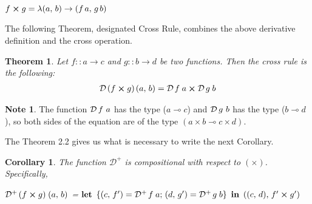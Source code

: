 \documentclass[11pt,a4]{article}
\newtheorem{teor}{Theorem}[section]
\newtheorem{coro}{Corollary}[section]
\theoremstyle{definition}
\theoremstyle{Definition}
\theoremstyle{Definition}
\newtheorem{nota}{Note}[section]
\begin{document}
	$f \boldsymbol{\times} g = \lambda(a,\hspace{0.5mm} b) \to (f \hspace{0.5mm} a,\hspace{0.5mm} g \hspace{0.5mm} b) $
	
	
	The following Theorem, designated Cross Rule, combines the above derivative definition and the cross operation.
	
	\begin{teor}
		Let $f :: a \to c$ and $g :: b \to d$ be two functions. Then the cross rule is the following:
		\begin{align*}
		\mathcal{D} \hspace{0.5mm} (f \boldsymbol{\times} g) \hspace{0.5mm} (a,\hspace{0.5mm} b) = \mathcal{D} \hspace{0.5mm} f \hspace{0.9mm} a \boldsymbol{\times} \mathcal{D} \hspace{0.5mm} g \hspace{0.9mm} b
		\end{align*}
	\end{teor}
	
	\begin{nota}
		
		The function $\mathcal{D} \hspace{0.6mm} f \ a$ has the type ($a \multimap c$) and $\mathcal{D} \hspace{0.6mm} g \ b$ has the type ($b \multimap d$), so both sides of the equation are of the type $(a \times b \multimap c \times d)$.
	\end{nota}
	
	The Theorem 2.2 gives us what is necessary to write the next Corollary.
	
	\begin{coro}
		The function $\mathcal{D}^{+}$ is compositional with respect to $(\boldsymbol{\times})$. Specifically,
		
		\quad $\mathcal{D}^{+} \hspace{0.5mm} (f \boldsymbol{\times} g) \hspace{0.9mm} (a,\hspace{0.5mm} b)$ = $\bf let$ $\{(c,\hspace{0.5mm} f') = \mathcal{D}^{+} \hspace{0.5mm} f \hspace{0.9mm} a; \hspace{0.5mm} (d,\hspace{0.5mm} g')=\mathcal{D}^{+} \hspace{0.5mm} g \hspace{0.9mm} b \}$ $\bf in$  $((c,\hspace{0.5mm} d), \hspace{0.5mm} f' \boldsymbol{\times} g' ) $
		
	\end{coro}
	
\end{document}
